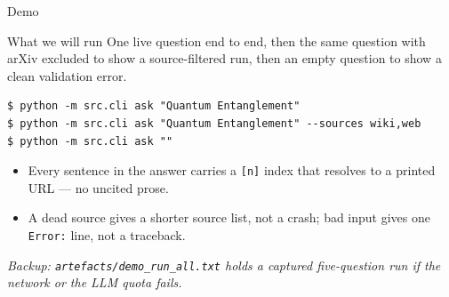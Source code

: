 \documentclass[aspectratio=169,11pt]{beamer}
\begin{document}
\begin{frame}[fragile]{Demo}
  \begin{block}{What we will run}
    One live question end to end, then the same question with arXiv excluded to show a source-filtered run,
    then an empty question to show a clean validation error.
  \end{block}

  \vspace{0.3em}
\begin{lstlisting}[style=shell]
$ python -m src.cli ask "Quantum Entanglement"
$ python -m src.cli ask "Quantum Entanglement" --sources wiki,web
$ python -m src.cli ask ""
\end{lstlisting}

  \vspace{0.2em}
  {\small
  \begin{itemize}\setlength\itemsep{0.2em}
    \item Every sentence in the answer carries a \texttt{[n]} index that resolves to a printed URL ---
      no uncited prose.
    \item A dead source gives a shorter source list, not a crash; bad input gives one
      \texttt{Error:} line, not a traceback.
  \end{itemize}}

  \vspace{0.2em}
  {\footnotesize\itshape Backup: \texttt{artefacts/demo\_run\_all.txt} holds a captured five-question
  run if the network or the LLM quota fails.}
\end{frame}
\end{document}
